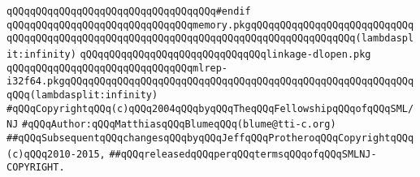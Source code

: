 \verb|qQQqqQQqqQQqqQQqqQQqqQQqqQQqqQQqqQQq#endif|\newline
\newline
\verb|qQQqqQQqqQQqqQQqqQQqqQQqqQQqqQQqmemory.pkgqQQqqQQqqQQqqQQqqQQqqQQqqQQqqQQqqQQqqQQqqQQqqQQqqQQqqQQqqQQqqQQqqQQqqQQqqQQqqQQqqQQqqQQq(lambdasplit:infinity)|\newline
\newline
\verb|qQQqqQQqqQQqqQQqqQQqqQQqqQQqqQQqlinkage-dlopen.pkg|\newline
\verb|qQQqqQQqqQQqqQQqqQQqqQQqqQQqqQQqmlrep-i32f64.pkgqQQqqQQqqQQqqQQqqQQqqQQqqQQqqQQqqQQqqQQqqQQqqQQqqQQqqQQqqQQqqQQq(lambdasplit:infinity)|\newline
\newline
\newline
\newline
\verb|#qQQqCopyrightqQQq(c)qQQq2004qQQqbyqQQqTheqQQqFellowshipqQQqofqQQqSML/NJ|\newline
\verb|#qQQqAuthor:qQQqMatthiasqQQqBlumeqQQq(blume@tti-c.org)|\newline
\verb|##qQQqSubsequentqQQqchangesqQQqbyqQQqJeffqQQqProtheroqQQqCopyrightqQQq(c)qQQq2010-2015,|\newline
\verb|##qQQqreleasedqQQqperqQQqtermsqQQqofqQQqSMLNJ-COPYRIGHT.|\newline

